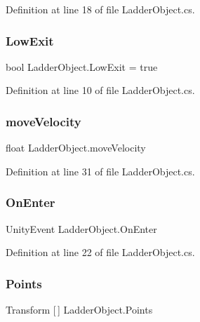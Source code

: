 Definition at line 18 of file Ladder\+Object.\+cs.

\mbox{\label{class_ladder_object_aa466f4797dc3eb5c97f1b44861a23872}} 
\subsubsection{\texorpdfstring{Low\+Exit}{LowExit}}
{\footnotesize\ttfamily bool Ladder\+Object.\+Low\+Exit = true}



Definition at line 10 of file Ladder\+Object.\+cs.

\mbox{\label{class_ladder_object_a80845108cd678da40fc9519acdd5f9a4}} 
\subsubsection{\texorpdfstring{move\+Velocity}{moveVelocity}}
{\footnotesize\ttfamily float Ladder\+Object.\+move\+Velocity}



Definition at line 31 of file Ladder\+Object.\+cs.

\mbox{\label{class_ladder_object_ab1104ffe4ebc8977633affb6c7e3fda6}} 
\subsubsection{\texorpdfstring{On\+Enter}{OnEnter}}
{\footnotesize\ttfamily Unity\+Event Ladder\+Object.\+On\+Enter}



Definition at line 22 of file Ladder\+Object.\+cs.

\mbox{\label{class_ladder_object_a6d87f62a0637a961b199cbc46947f268}} 
\subsubsection{\texorpdfstring{Points}{Points}}
{\footnotesize\ttfamily Transform \mbox{[}$\,$\mbox{]} Ladder\+Object.\+Points}



